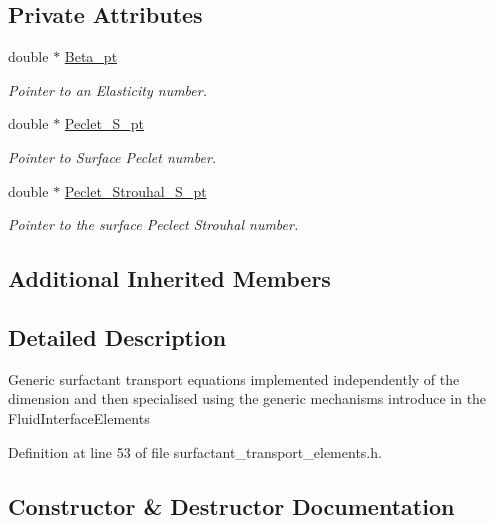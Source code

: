 \subsection*{Private Attributes}
\begin{DoxyCompactItemize}
\item 
double $\ast$ \hyperlink{classoomph_1_1SurfactantTransportInterfaceElement_ab5140eb5a576820321032b10a894b530}{Beta\+\_\+pt}
\begin{DoxyCompactList}\small\item\em Pointer to an Elasticity number. \end{DoxyCompactList}\item 
double $\ast$ \hyperlink{classoomph_1_1SurfactantTransportInterfaceElement_a50b4771707337535c081324f2f0d8c30}{Peclet\+\_\+\+S\+\_\+pt}
\begin{DoxyCompactList}\small\item\em Pointer to Surface Peclet number. \end{DoxyCompactList}\item 
double $\ast$ \hyperlink{classoomph_1_1SurfactantTransportInterfaceElement_a3c4a6abcb3795ee53baff49864cd0020}{Peclet\+\_\+\+Strouhal\+\_\+\+S\+\_\+pt}
\begin{DoxyCompactList}\small\item\em Pointer to the surface Peclect Strouhal number. \end{DoxyCompactList}\end{DoxyCompactItemize}
\subsection*{Additional Inherited Members}


\subsection{Detailed Description}
Generic surfactant transport equations implemented independently of the dimension and then specialised using the generic mechanisms introduce in the Fluid\+Interface\+Elements 

Definition at line 53 of file surfactant\+\_\+transport\+\_\+elements.\+h.



\subsection{Constructor \& Destructor Documentation}
\mbox{\label{classoomph_1_1SurfactantTransportInterfaceElement_a8934ab8e723427ed39298c592b2876a5}} 
